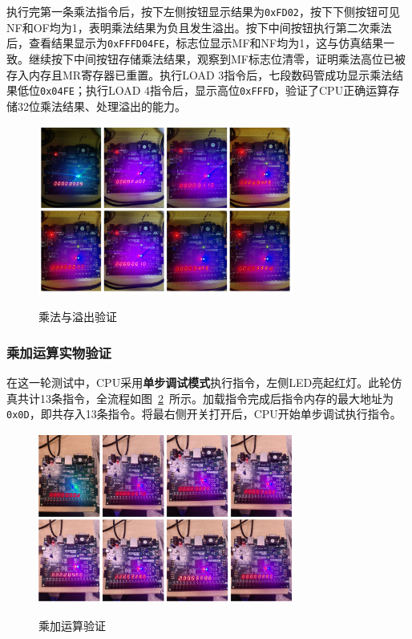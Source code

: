 \documentclass[lang=cn,a4paper,newtx]{elegantpaper}
\begin{document}
执行完第一条乘法指令后，按下左侧按钮显示结果为\texttt{0xFD02}，按下下侧按钮可见NF和OF均为1，表明乘法结果为负且发生溢出。按下中间按钮执行第二次乘法后，查看结果显示为\texttt{0xFFFD04FE}，标志位显示MF和NF均为1，这与仿真结果一致。继续按下中间按钮存储乘法结果，观察到MF标志位清零，证明乘法高位已被存入内存且MR寄存器已重置。执行LOAD 3指令后，七段数码管成功显示乘法结果低位\texttt{0x04FE}；执行LOAD 4指令后，显示高位\texttt{0xFFFD}，验证了CPU正确运算存储32位乘法结果、处理溢出的能力。
\begin{figure}[htbp]
  \centering
  \caption{乘法与溢出验证}
  \includegraphics[width = 0.75\textwidth]{figure/mul_verification.pdf}
  \label{fig:FPGA_mul}
\end{figure}

\subsubsection{乘加运算实物验证}
在这一轮测试中，CPU采用\textbf{单步调试模式}执行指令，左侧LED亮起红灯。此轮仿真共计13条指令，全流程如图~\ref{fig:FPGA_muladd}~所示。加载指令完成后指令内存的最大地址为\texttt{0x0D}，即共存入13条指令。将最右侧开关打开后，CPU开始单步调试执行指令。

\begin{figure}[htbp]
  \centering
  \caption{乘加运算验证}
  \includegraphics[width = 0.75\textwidth]{figure/mul_add_verification.pdf}
  \label{fig:FPGA_muladd}
\end{figure}
\end{document}
